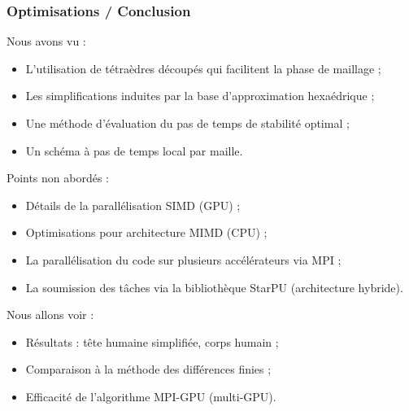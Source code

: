 \begin{frame}
\frametitle{Optimisations / Conclusion}
\vfill
Nous avons vu :
\begin{itemize}
\item L'utilisation de tétraèdres découpés qui facilitent la phase de maillage ;
\item Les simplifications induites par la base d'approximation hexaédrique ;
\item Une méthode d'évaluation du pas de temps de stabilité optimal ;
\item Un schéma à pas de temps local par maille.
\end{itemize}
\vfill
\pause
Points non abordés :
\begin{itemize}
\item Détails de la parallélisation SIMD (GPU) ;
\item Optimisations pour architecture MIMD (CPU) ;
\item La parallélisation du code sur plusieurs accélérateurs via MPI ;
\item La soumission des tâches via la bibliothèque StarPU (architecture hybride).
\end{itemize}
\vfill
\pause
Nous allons voir :
\begin{itemize}
\item Résultats : tête humaine simplifiée, corps humain ;
\item Comparaison à la méthode des différences finies ;
\item Efficacité de l'algorithme MPI-GPU (multi-GPU).
\end{itemize}
\vfill
\end{frame}

